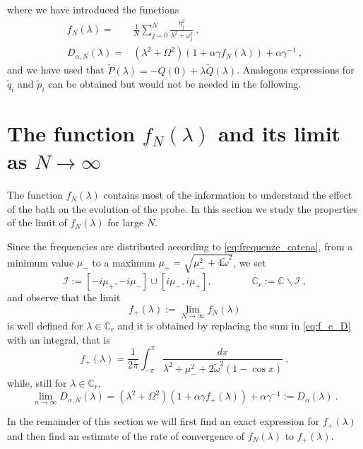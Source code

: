 \documentclass[11pt]{article}
\numberwithin{equation}{section}
\numberwithin{theorem}{section}
\newcommand{\matht}[1]{\texorpdfstring{#1}{}}
\def\tilde#1{\widetilde{#1}}
\begin{document}
where we have introduced the functions
\begin{equation}\label{eq:f_e_D}
\begin{aligned}
f_N(\lambda)=&
\frac{1}{N}
\sum_{j=0}^N \frac{\eta_j^{2}}{\lambda^2+\omega_j^2}\ ,\\
D_{\alpha,N}(\lambda)
=& \left(\lambda^2+\Omega^2\right)\left(1+\alpha\gamma
f_N(\lambda)\right) + \alpha\gamma^{-1}\ ,
\end{aligned}
\end{equation}
and we have used that $\tilde P(\lambda)=-Q(0)+\lambda \tilde Q(\lambda)$. Analogous expressions for $\tilde q_i$ and
$\tilde p_i$ can be obtained but would not be needed in the following.


\section{The function \matht{$f_N(\lambda)$} and its limit as \matht{$N\to\infty$}}\label{sec:f}

The function $f_N(\lambda)$ contains most of the information to understand the effect of the bath on the evolution of
the probe. In this section we study the properties of the limit of $f_N(\lambda)$ for large $N$.

Since the frequencies are distributed according to \eqref{eq:frequenze_catena}, from a minimum value $\mu_-$ to a
maximum $\mu_+ = \sqrt{\mu_-^2+4\tilde\omega^2}$, we set
\begin{equation}\label{eq:sets}
 \mathcal I:=\left[-i\mu_+, -i\mu_-\right]\cup
\left[i\mu_-, i\mu_+\right],\qquad\qquad \mathds{C}_r:=\mathds
C\backslash \mathcal I\ ,
\end{equation}
and observe that the limit
\[
 f_+(\lambda):=\lim_{N\to\infty}f_N(\lambda)
\]
is well defined for $\lambda\in \mathds{C}_r$ and it is obtained by replacing the sum in \eqref{eq:f_e_D} with an
integral, that is
\begin{equation}\label{eq:def_f_1}
f_+(\lambda)=\frac1{2\pi}
\int_{-\pi}^{\pi} \frac{dx}{\lambda^2+\mu_-^2+2\tilde\omega^2\left(1-\cos
x\right)}\ ,
\end{equation}
while, still for $\lambda\in \mathds C_r$,
\begin{equation}\label{eq:def_D_alpha} \lim_{n\to\infty} D_{\alpha,N}(\lambda)=
(\lambda^2+\Omega^2)(1 +\alpha\gamma f_+(\lambda))
+\alpha\gamma^{-1}:=D_{\alpha}(\lambda)\ .
\end{equation}


In the remainder of this section we will first find an exact expression for $f_+(\lambda)$ and then find an estimate of
the rate of convergence of $f_N(\lambda)$ to $f_+(\lambda)$.
\end{document}
